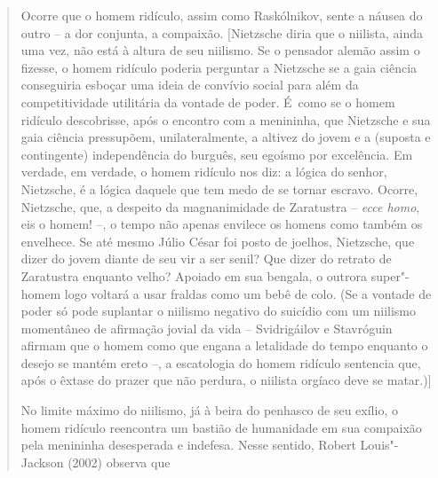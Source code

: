 {\begin{quote}
Ocorre que o homem ridículo, assim como Raskólnikov, sente a náusea do
outro -- a dor conjunta, a compaixão. {[}Nietzsche diria que o niilista,
ainda uma vez, não está à altura de seu niilismo. Se o pensador alemão
assim o fizesse, o homem ridículo poderia perguntar a Nietzsche se a
gaia ciência conseguiria esboçar uma ideia de convívio social para além
da competitividade utilitária da vontade de poder. É~como se o homem
ridículo descobrisse, após o encontro com a menininha, que Nietzsche e
sua gaia ciência pressupõem, unilateralmente, a altivez do jovem e a
(suposta e contingente) independência do burguês, seu egoísmo por
excelência. Em verdade, em verdade, o homem ridículo nos diz: a lógica
do senhor, Nietzsche, é a lógica daquele que tem medo de se tornar
escravo. Ocorre, Nietzsche, que, a despeito da magnanimidade de
Zaratustra -- \emph{ecce homo}, eis o homem! --, o tempo não apenas
envilece os homens como também os envelhece. Se até mesmo Júlio César
foi posto de joelhos, Nietzsche, que dizer do jovem diante de seu vir a
ser senil? Que dizer do retrato de Zaratustra enquanto velho? Apoiado em
sua bengala, o outrora super"-homem logo voltará a usar fraldas como um
bebê de colo. (Se a vontade de poder só pode suplantar o niilismo
negativo do suicídio com um niilismo momentâneo de afirmação jovial da
vida -- Svidrigáilov e Stavróguin afirmam que o homem como que engana a
letalidade do tempo enquanto o desejo se mantém ereto --, a escatologia
do homem ridículo sentencia que, após o êxtase do prazer que não
perdura, o niilista orgíaco deve se matar.){]}

No limite máximo do niilismo, já à beira do penhasco de seu exílio, o
homem ridículo reencontra um bastião de humanidade em sua compaixão pela
menininha desesperada e indefesa. Nesse sentido, Robert Louis"-Jackson
(2002) observa que


\end{quote}}
